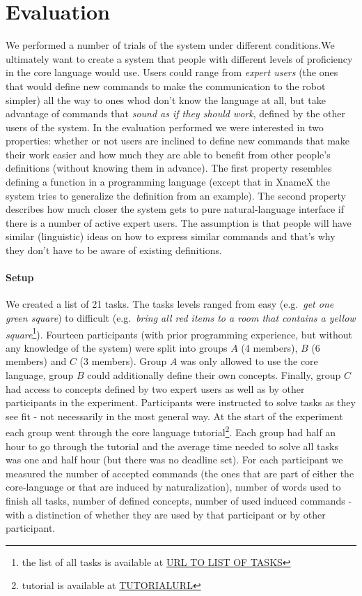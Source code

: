 \section{Evaluation}


We performed a number of trials of the system under different conditions.We ultimately want to create a system that people with different levels of proficiency in the core language would use. Users could range from \emph{expert users}  (the ones that would define new commands to make the communication to the robot simpler) all the way to ones whod don't know the language at all, but take advantage of commands that \emph{sound as if they should work}, defined by the other users of the system.
In the evaluation performed we were interested in two properties: whether or not users are inclined to define new commands that make their work easier and how much they are able to benefit from other people's definitions (without knowing them in advance).  The first property resembles defining a function in a programming language (except that in XnameX the system tries to generalize the definition from an example). The second property describes how much closer the system gets to pure natural-language interface if there is a number of active expert users. The assumption is that people will have similar (linguistic) ideas on how to express similar commands and that's why they don't have to be aware of existing definitions.
\paragraph*{\textbf{Setup}} We created a list of 21 tasks. The tasks levels ranged from easy (e.g.\  \emph{get one green square}) to difficult (e.g.\ \emph{bring all red items to a room that contains a yellow square}\footnote{the list of all tasks is available at \url{URL TO LIST OF TASKS}}). Fourteen participants (with prior programming experience, but without any knowledge of the system) were split into groups $A$ (4 members), $B$ (6 members) and $C$ (3 members). Group $A$ was only allowed to use the core language, group $B$ could additionally define their own concepts. Finally, group $C$ had access to concepts defined by two expert users as well as by other participants in the experiment. Participants were instructed to solve tasks as they see fit - not necessarily in the most general way. At the start of the experiment each group went through the core language tutorial\footnote{tutorial is available at \url{TUTORIALURL}}. Each group had half an hour to go through the tutorial and the average time needed to solve all tasks was one and half hour (but there was no deadline set). For each participant we measured the number of accepted commands (the ones that are part of either the core-language or that are induced by naturalization), number of words used to finish all tasks, number of defined concepts, number of used induced commands - with a distinction of whether they are used by that participant or by other participant.
